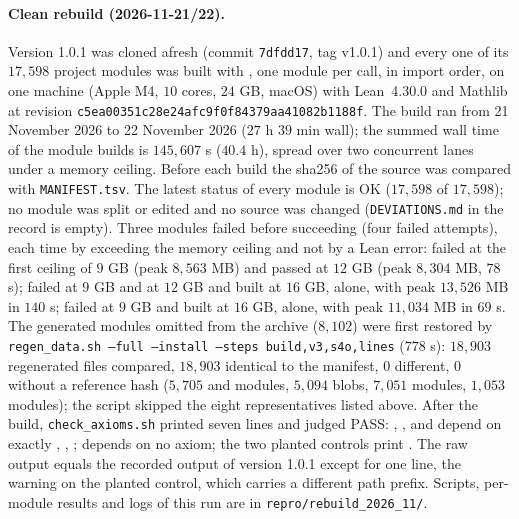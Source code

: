 \documentclass[11pt]{article}
\theoremstyle{remark}
\begin{document}
\paragraph{Clean rebuild (2026-11-21/22).} Version 1.0.1 was cloned afresh (commit \texttt{7dfdd17}, tag v1.0.1) and every one of its $17{,}598$ project modules was built with , one module per call, in import order, on one machine (Apple M4, $10$ cores, $24$ GB, macOS) with Lean~4.30.0 and Mathlib at revision \texttt{c5ea00351c28e24afc9f0f84379aa41082b1188f}. The build ran from 21 November 2026 to 22 November 2026 ($27$ h $39$ min wall); the summed wall time of the module builds is $145{,}607$ s ($40.4$ h), spread over two concurrent lanes under a memory ceiling. Before each build the sha256 of the source was compared with \texttt{MANIFEST.tsv}. The latest status of every module is OK ($17{,}598$ of $17{,}598$); no module was split or edited and no source was changed (\texttt{DEVIATIONS.md} in the record is empty). Three modules failed before succeeding (four failed attempts), each time by exceeding the memory ceiling and not by a Lean error:  failed at the first ceiling of $9$ GB (peak $8{,}563$ MB) and passed at $12$ GB (peak $8{,}304$ MB, $78$ s);  failed at $9$ GB and at $12$ GB and built at $16$ GB, alone, with peak $13{,}526$ MB in $140$ s;  failed at $9$ GB and built at $16$ GB, alone, with peak $11{,}034$ MB in $69$ s. The generated modules omitted from the archive ($8{,}102$) were first restored by \texttt{regen\_data.sh --full --install --steps build,v3,s4o,lines} ($778$ s): $18{,}903$ regenerated files compared, $18{,}903$ identical to the manifest, $0$ different, $0$ without a reference hash ($5{,}705$  and  modules, $5{,}094$  blobs, $7{,}051$  modules, $1{,}053$  modules); the script skipped the eight representatives listed above. After the build, \texttt{check\_axioms.sh} printed seven lines and judged PASS: , ,  and  depend on exactly , , ;  depends on no axiom; the two planted controls print . The raw output equals the recorded output of version 1.0.1 except for one line, the warning on the planted control, which carries a different path prefix. Scripts, per-module results and logs of this run are in \texttt{repro/rebuild\_2026\_11/}.
\end{document}
